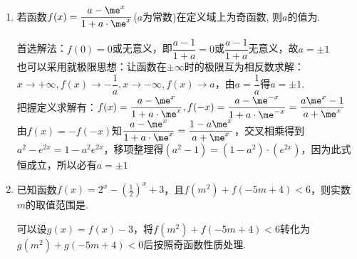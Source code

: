 \begin{enumerate}
\begin{enumerate}
\begin{jieda}
\begin{enumerate}
            \item $f(x)$必然是单调函数，因此只需其两个端点满足要求即可保证恒成立，即$f(1) > 1, f(2) > 1$, 解得$a\in(-\infty,-5)\cup(1,+\infty)$. 
            \end{enumerate}
        \end{jieda}
        \item 若函数$f(x)=\dfrac{a-\me^x}{1+a\cdot\me^x}$($a$为常数)在定义域上为奇函数, 则$a$的值为. 
        \begin{jieda}
        首选解法：$f(0)=0$或无意义，即$\dfrac{a-1}{1+a} = 0$或$\dfrac{a-1}{1+a}$无意义，故$a = \pm 1$\\
        也可以采用就极限思想：让函数在$\pm \infty$时的极限互为相反数求解：$x \rightarrow +\infty, f(x) \rightarrow -\dfrac{1}{a}, x \rightarrow -\infty, f(x) \rightarrow a$，由$a = \dfrac{1}{a}$得$a = \pm 1$. \\
        把握定义求解有：$f(x) = \dfrac{a-\me^x}{1+a\cdot\me^x}, f(-x) = \dfrac{a-\me^{-x}}{1+a\cdot\me^{-x}} = \dfrac{a\me^{x}-1}{a+\me^{x}}$ \\
        由$f(x) = -f(-x)$知$\dfrac{a-\me^x}{1+a\cdot\me^x} = \dfrac{1-a\me^{x}}{a+\me^{x}}$，交叉相乘得到$a^2 - e^{2x} = 1-a^2e^{2x}$，移项整理得$(a^2-1) = (1-a^2)\cdot(e^{2x})$，因为此式恒成立，所以必有$a = \pm 1$
        \end{jieda}
        \item 已知函数$f(x) = 2^x - (\frac{1}{2})^x+3$，且$f(m^2)+f(-5m+4)<6$，则实数$m$的取值范围是.
        \begin{jieda}
            可以设$g(x) = f(x) - 3$，将$f(m^2)+f(-5m+4)<6$转化为$g(m^2)+g(-5m+4)<0$后按照奇函数性质处理.
        \end{jieda}
            

\end{enumerate}
\end{enumerate}

